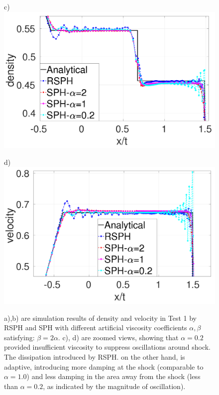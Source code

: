 \documentclass[review]{elsarticle}
\begin{document}
\begin{figure}[H]
    \begin{minipage}{.495\textwidth}
        \centering c)
        \includegraphics[width=0.99 \textwidth,height=0.7\textwidth]{./Figures/RCM-Sod-SPH-alf-rho-zoom}
    \end{minipage}%
    \begin{minipage}{.495 \textwidth}
        \centering d)
        \includegraphics[width=0.99 \textwidth,height=0.7\textwidth]{./Figures/RCM-Sod-SPH-alf-v-zoom}
    \end{minipage}%
    \caption{a),b) are simulation results of density and velocity in Test 1 by RSPH and SPH with different artificial viscosity coefficients $\alpha,\beta$ satisfying: $\beta=2\alpha$.  c), d) are zoomed views, showing that $\alpha=0.2$ provided insufficient viscosity to suppress oscillations around shock. The dissipation introduced by RSPH. on the other hand, is adaptive, introducing more damping at the shock (comparable to $\alpha=1.0$) and less damping in the area away from the shock (less than $\alpha=0.2$, as indicated by the magnitude of oscillation).}
    \label{fig:RCM-Sod-SPH-alf}
\end{figure}
\end{document}
